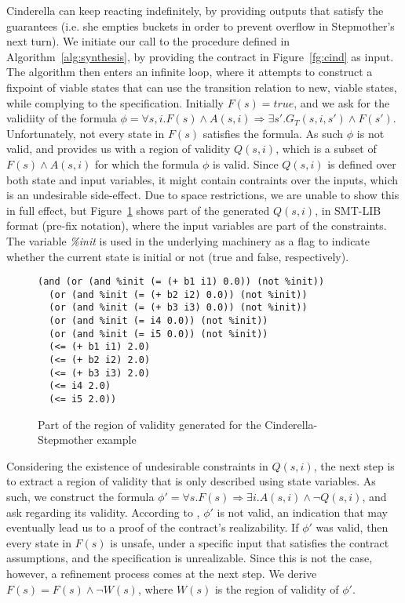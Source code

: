 Cinderella can keep reacting indefinitely, by providing outputs that satisfy the
guarantees (i.e. she empties buckets in order to prevent overflow in Stepmother's next turn).
We initiate our call to the procedure defined in Algorithm~\ref{alg:synthesis},
by providing the contract in Figure~\ref{fg:cind} as input. The algorithm
then enters an infinite loop, where it attempts to construct a fixpoint of
viable states that can use the transition relation to new, viable states,
while complying to the specification. Initially $F(s) = true$, and we ask \aeval for the validiity of the formula $\phi = \forall s,i. F(s) \land A(s,i) \Rightarrow \exists
s'.G_{T}(s,i,s') \land F(s')$. Unfortunately, not every state in $F(s)$
satisfies the formula. As such $\phi$ is not valid, and \aeval provides us with
a region of validity $Q(s,i)$, which is a subset of $F(s) \land A(s,i)$ for
which the formula $\phi$ is valid. Since $Q(s,i)$ is defined over both state and
input variables, it might contain contraints over the inputs, which is an
undesirable side-effect. Due to space restrictions, we are unable to show this
in full effect, but Figure~\ref{fg:snippet} shows part of the generated
$Q(s,i)$, in SMT-LIB format (pre-fix notation), where the input variables are
part of the constraints. The variable \textit{\%init} is used in the underlying
machinery as a flag to indicate whether the current state is initial or not
(true and false, respectively).

\begin{figure}[!t]
\centering
 \begin{Verbatim}[fontsize=\scriptsize]
(and (or (and %init (= (+ b1 i1) 0.0)) (not %init))
  (or (and %init (= (+ b2 i2) 0.0)) (not %init))
  (or (and %init (= (+ b3 i3) 0.0)) (not %init))
  (or (and %init (= i4 0.0)) (not %init))
  (or (and %init (= i5 0.0)) (not %init))
  (<= (+ b1 i1) 2.0)
  (<= (+ b2 i2) 2.0)
  (<= (+ b3 i3) 2.0)
  (<= i4 2.0)
  (<= i5 2.0))
 \end{Verbatim}
\caption{Part of the region of validity generated for the Cinderella-Stepmother
example}
\label{fg:snippet}
\end{figure}  

Considering the existence of undesirable constraints in $Q(s,i)$, the next step
is to extract a region of validity that is only described using state variables.
As such, we construct the formula $\phi' = \forall s. F(s) \Rightarrow \exists
i. A(s,i) \land \lnot Q(s,i)$, and ask \aeval regarding its validity. According
to \aeval, $\phi'$ is not valid, an indication that may eventually lead us to a
proof of the contract's realizability. If $\phi'$ was valid, then every state in
$F(s)$ is unsafe, under a specific input that satisfies the contract
assumptions, and the specification is unrealizable. Since this is not the case,
however, a refinement process comes at the next step. We derive $F(s) = F(s)
\land \lnot W(s)$, where $W(s)$ is the region of validity of $\phi'$.

